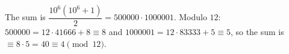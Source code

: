 The sum is $\dfrac{10^6\left(10^6+1\right)}{2}=500000\cdot1000001$. Modulo $12$: $500000=12\cdot41666+8\equiv8$ and $1000001=12\cdot83333+5\equiv5$, so the sum is $\equiv8\cdot5=40\equiv\boxed{4}\pmod{12}$.
